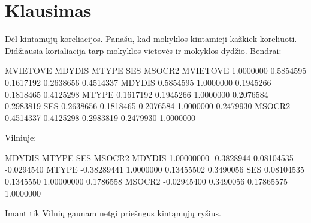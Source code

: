 \documentclass[a4paper]{article}
\begin{document}
\section{Klausimas}
Dėl kintamųjų koreliacijos. Panašu, kad mokyklos kintamieji kažkiek koreliuoti. Didžiausia korialiacija tarp mokyklos vietovės ir mokyklos dydžio. Bendrai:
\begin{Schunk}
\begin{Soutput}
          MVIETOVE    MDYDIS     MTYPE       SES    MSOCR2
MVIETOVE 1.0000000 0.5854595 0.1617192 0.2638656 0.4514337
MDYDIS   0.5854595 1.0000000 0.1945266 0.1818465 0.4125298
MTYPE    0.1617192 0.1945266 1.0000000 0.2076584 0.2983819
SES      0.2638656 0.1818465 0.2076584 1.0000000 0.2479930
MSOCR2   0.4514337 0.4125298 0.2983819 0.2479930 1.0000000
\end{Soutput}
\end{Schunk}
Vilniuje:
\begin{Schunk}
\begin{Soutput}
            MDYDIS      MTYPE        SES     MSOCR2
MDYDIS  1.00000000 -0.3828944 0.08104535 -0.0294540
MTYPE  -0.38289441  1.0000000 0.13455502  0.3490056
SES     0.08104535  0.1345550 1.00000000  0.1786558
MSOCR2 -0.02945400  0.3490056 0.17865575  1.0000000
\end{Soutput}
\end{Schunk}
Imant tik Vilnių gaunam netgi priešngus kintąmųjų ryšius.
\end{document}
